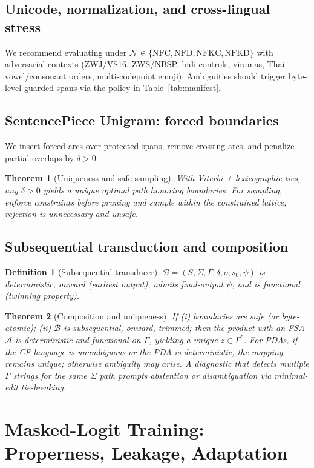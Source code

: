 \documentclass{article}
\newtheorem{definition}{Definition}
\newtheorem{theorem}{Theorem}
\begin{document}
\subsection{Unicode, normalization, and cross-lingual stress}
We recommend evaluating under $\mathcal{N}\in\{\mathrm{NFC,NFD,NFKC,NFKD}\}$ with adversarial contexts (ZWJ/VS16, ZWS/NBSP, bidi controls, viramas, Thai vowel/consonant orders, multi-codepoint emoji). Ambiguities should trigger byte-level guarded spans via the policy in Table~\ref{tab:manifest}.

\subsection{SentencePiece Unigram: forced boundaries}
We insert forced arcs over protected spans, remove crossing arcs, and penalize partial overlaps by $\delta>0$.
\begin{theorem}[Uniqueness and safe sampling]\label{thm:uni}
With Viterbi + lexicographic ties, any $\delta>0$ yields a unique optimal path honoring boundaries. For sampling, enforce constraints before pruning and sample within the constrained lattice; rejection is unnecessary and unsafe.
\end{theorem}

\subsection{Subsequential transduction and composition}\label{sec:transducer}
\begin{definition}[Subsequential transducer]
$\mathcal{B}=(S,\Sigma,\Gamma,\delta,o,s_0,\psi)$ is deterministic, onward (earliest output), admits final-output $\psi$, and is functional (twinning property).
\end{definition}

\begin{theorem}[Composition and uniqueness]\label{thm:comp}
If (i) boundaries are safe (or byte-atomic); (ii) $\mathcal{B}$ is subsequential, onward, trimmed; then the product with an FSA $\mathcal{A}$ is deterministic and functional on $\Gamma$, yielding a unique $z\in\Gamma^\ast$. For PDAs, if the CF language is unambiguous or the PDA is deterministic, the mapping remains unique; otherwise ambiguity may arise. A diagnostic that detects multiple $\Gamma$ strings for the same $\Sigma$ path prompts abstention or disambiguation via minimal-edit tie-breaking.
\end{theorem}

\section{Masked-Logit Training: Properness, Leakage, Adaptation}
\end{document}

